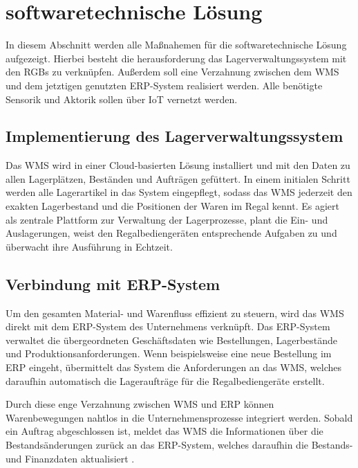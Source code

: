 \section{softwaretechnische Lösung}
In diesem Abschnitt werden alle Maßnahemen für die softwaretechnische Lösung aufgezeigt. Hierbei besteht die herausforderung das Lagerverwaltungssystem mit den RGBs zu verknüpfen. Außerdem soll eine Verzahnung zwischen dem WMS und dem jetztigen genutzten ERP-System realisiert werden. Alle benötigte Sensorik und Aktorik sollen über IoT vernetzt werden.
\subsection{Implementierung des Lagerverwaltungssystem}
Das WMS wird in einer Cloud-basierten Lösung installiert und mit den Daten zu allen Lagerplätzen, Beständen und Aufträgen gefüttert. In einem initialen Schritt werden alle Lagerartikel in das System eingepflegt, sodass das WMS jederzeit den exakten Lagerbestand und die Positionen der Waren im Regal kennt. Es agiert als zentrale Plattform zur Verwaltung der Lagerprozesse, plant die Ein- und Auslagerungen, weist den Regalbediengeräten entsprechende Aufgaben zu und überwacht ihre Ausführung in Echtzeit\autocites{wehking_technisches_2020}.

\subsection{Verbindung mit ERP-System}
Um den gesamten Material- und Warenfluss effizient zu steuern, wird das WMS direkt mit dem ERP-System des Unternehmens verknüpft. Das ERP-System verwaltet die übergeordneten Geschäftsdaten wie Bestellungen, Lagerbestände und Produktionsanforderungen. Wenn beispielsweise eine neue Bestellung im ERP eingeht, übermittelt das System die Anforderungen an das WMS, welches daraufhin automatisch die Lageraufträge für die Regalbediengeräte erstellt.

Durch diese enge Verzahnung zwischen WMS und ERP können Warenbewegungen nahtlos in die Unternehmensprozesse integriert werden. Sobald ein Auftrag abgeschlossen ist, meldet das WMS die Informationen über die Bestandsänderungen zurück an das ERP-System, welches daraufhin die Bestands- und Finanzdaten aktualisiert \autocites{sarferaz_erp-marktanalyse_2023}
\autocites{modula_2024}.

